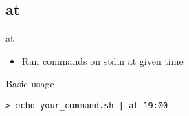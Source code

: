 
\subsection{at}

\begin{frame}[fragile]{at}
  \begin{itemize}
    \pause \item Run commands on stdin at given time
  \end{itemize}
  \pause

  \begin{exampleblock}{Basic usage}
    \begin{lstlisting}[showstringspaces=false]
> echo your_command.sh | at 19:00
    \end{lstlisting}
  \end{exampleblock}
\end{frame}



